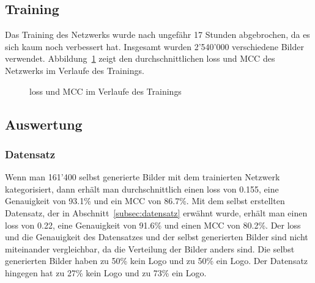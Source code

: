 \documentclass[12pt,a4paper]{report}
\begin{document}
\subsection{Training}
Das Training des Netzwerks wurde nach ungefähr 17 Stunden abgebrochen, da es sich kaum noch verbessert hat.
Insgesamt wurden 2'540'000 verschiedene Bilder verwendet.
Abbildung~\ref{fig:loss1} zeigt den durchschnittlichen loss und MCC
des Netzwerks im Verlaufe des Trainings.
\begin{figure}[h]%
    \centering
    \qquad
    \caption{loss und MCC im Verlaufe des Trainings}%
    \label{fig:loss1}%
\end{figure}
\subsection{Auswertung}
\subsubsection{Datensatz}
Wenn man 161'400 selbst generierte Bilder mit dem trainierten Netzwerk kategorisiert, dann erhält man durchschnittlich einen loss von 0.155,
eine Genauigkeit von 93.1\% und ein MCC von 86.7\%.
Mit dem selbst erstellten Datensatz, der in Abschnitt~\ref{subsec:datensatz} erwähnt wurde,
erhält man einen loss von 0.22, eine Genauigkeit von 91.6\% und einen MCC von 80.2\%.
Der loss und die Genauigkeit des Datensatzes und der selbst generierten Bilder sind nicht miteinander vergleichbar,
da die Verteilung der Bilder anders sind.
Die selbst generierten Bilder haben zu 50\% kein Logo und zu 50\% ein Logo.
Der Datensatz hingegen hat zu 27\% kein Logo und zu 73\% ein Logo.
\end{document}

